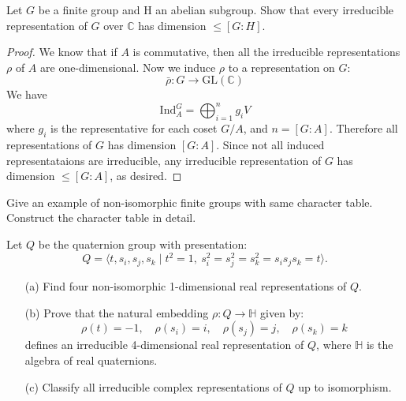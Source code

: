 \begin{prob}[S2017-Q6]
    Let $G$ be a finite group and H an abelian subgroup. Show that every
    irreducible representation of $G$ over $\mathbb{C}$ has dimension 
    $\leq[G : H]$.
\end{prob}
\begin{proof}
    We know that if $A$ is commutative, then all the irreducible representations $\rho$ of $A$ are one-dimensional. Now we induce $\rho$ to a representation on $G$:
    \begin{equation*}
        \bar{\rho}:G\to\text{GL}(\mathbb{C})
    \end{equation*}
    We have 
    \begin{equation*}
        \text{Ind}_A^G=\bigoplus_{i=1}^n g_iV
    \end{equation*}
    where $g_i$ is the representative for each coset $G/A$, and $n=[G:A]$. Therefore all representations of $G$ has dimension $[G:A]$. Since not all induced representataions are irreducible, any irreducible representation of $G$ has dimension $\leq[G:A]$, as desired.
\end{proof}

\begin{prob}[S2008-Q6]
    Give an example of non-isomorphic finite groups with same character
table. Construct the character table in detail.
\end{prob}

\begin{prob}[S2012-Q4]
    Let \( Q \) be the quaternion group with presentation:
\[
Q = \langle t, s_i, s_j, s_k \mid t^2 = 1,\ s_i^2 = s_j^2 = s_k^2 = s_i s_j s_k = t \rangle.
\]

\begin{enumerate}
    \item[(a)] Find four non-isomorphic 1-dimensional real representations of \( Q \).
    
    \item[(b)] Prove that the natural embedding \( \rho \colon Q \to \mathbb{H} \) given by:
    \[
    \rho(t) = -1, \quad \rho(s_i) = i, \quad \rho(s_j) = j, \quad \rho(s_k) = k
    \]
    defines an irreducible 4-dimensional real representation of \( Q \), where \( \mathbb{H} \) is the algebra of real quaternions.
    
    \item[(c)] Classify all irreducible complex representations of \( Q \) up to isomorphism.
\end{enumerate}
\end{prob}

